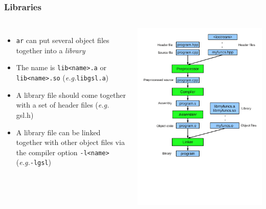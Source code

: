 \documentclass{slides}
\newcommand{\eg}{\textit{e.\thinspace g.}\xspace}
\begin{document}
\begin{frame}[fragile]
  \frametitle{Libraries}
  \begin{columns}[T,onlytextwidth]
  \begin{itemize}
  \item \lstinline!ar! can put several object files together into a
    \emph{library}
  \item The name is \lstinline!lib<name>.a! or
    \lstinline!lib<name>.so! (\eg \lstinline!libgsl.a!)
  \item A library file should come together with a set of header files
    (\eg gsl.h)
  \item A library file can be linked together with other object files
    via the compiler option \texttt{-l<name>} (\eg \texttt{-lgsl})
  \end{itemize}
    \includegraphics[height=1.1\textheight]{compilation}
  \end{columns}
\end{frame}
\end{document}

